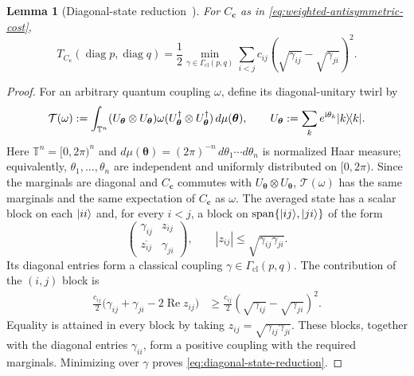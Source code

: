 \documentclass[11pt]{article}
\newtheorem{lemma}[theorem]{Lemma}
\newcommand{\ketbra}[2]{\ensuremath{\ket{#1}\!\bra{#2}}}
\DeclarePairedDelimiter\ket{\lvert}{\rangle}
\DeclarePairedDelimiter\bra{\langle}{\rvert}
\newcommand{\diag} {\operatorname{diag}}
\begin{document}
\begin{lemma}[Diagonal-state reduction~{\cite[Proposition~1]{Mil26}}]
\label{lem:diagonal-state-reduction}
    For $C_{\bm c}$ as in \eqref{eq:weighted-antisymmetric-cost},
    \begin{equation}\label{eq:diagonal-state-reduction}
        T_{C_{\bm c}}(\diag p,\diag q)
        =\frac12
        \min_{\gamma\in\Gamma_{\mathrm{cl}}(p,q)}
        \sum_{i<j}c_{ij}
        \left(\sqrt{\gamma_{ij}}-\sqrt{\gamma_{ji}}\right)^2.
    \end{equation}
\end{lemma}

\begin{proof}
    For an arbitrary quantum coupling $\omega$, define its
    diagonal-unitary twirl by
    \[
        \mathcal{T}(\omega)
        :=
        \int_{\mathbb{T}^n}
        (U_{\bm\theta}\otimes U_{\bm\theta})\omega
        (U_{\bm\theta}^\dagger\otimes U_{\bm\theta}^\dagger)
        \,d\mu(\bm\theta),
        \qquad
        U_{\bm\theta}:=\sum_k e^{\mathrm{i}\theta_k}\ketbra{k}{k}.
    \]
    Here $\mathbb{T}^n=[0,2\pi)^n$ and
    $d\mu(\bm\theta)=(2\pi)^{-n}\,d\theta_1\cdots d\theta_n$ is normalized
    Haar measure; equivalently, $\theta_1,\ldots,\theta_n$ are independent
    and uniformly distributed on $[0,2\pi)$.  Since the marginals are
    diagonal and $C_{\bm c}$ commutes with
    $U_{\bm\theta}\otimes U_{\bm\theta}$, $\mathcal{T}(\omega)$ has the same
    marginals and the same expectation of $C_{\bm c}$ as $\omega$.
    The averaged state has a scalar block on each $\ket{ii}$
    and, for every $i<j$, a block on
    $\operatorname{span}\{\ket{ij},\ket{ji}\}$ of the form
    \[
        \begin{pmatrix}
            \gamma_{ij}&z_{ij}\\
            \overline{z_{ij}}&\gamma_{ji}
        \end{pmatrix},
        \qquad
        |z_{ij}|\leq\sqrt{\gamma_{ij}\gamma_{ji}}.
    \]
    Its diagonal entries form a classical coupling
    $\gamma\in\Gamma_{\mathrm{cl}}(p,q)$.  The contribution of the
    $(i,j)$ block is
    \begin{align*}
        \frac{c_{ij}}2
        \bigl(\gamma_{ij}+\gamma_{ji}-2\operatorname{Re}z_{ij}\bigr)
        &\geq
        \frac{c_{ij}}2
        \left(\sqrt{\gamma_{ij}}-\sqrt{\gamma_{ji}}\right)^2.
    \end{align*}
    Equality is attained in every block by taking
    $z_{ij}=\sqrt{\gamma_{ij}\gamma_{ji}}$.  These blocks, together with
    the diagonal entries $\gamma_{ii}$, form a positive coupling with the
    required marginals.  Minimizing over $\gamma$ proves
    \eqref{eq:diagonal-state-reduction}.
\end{proof}
\end{document}
